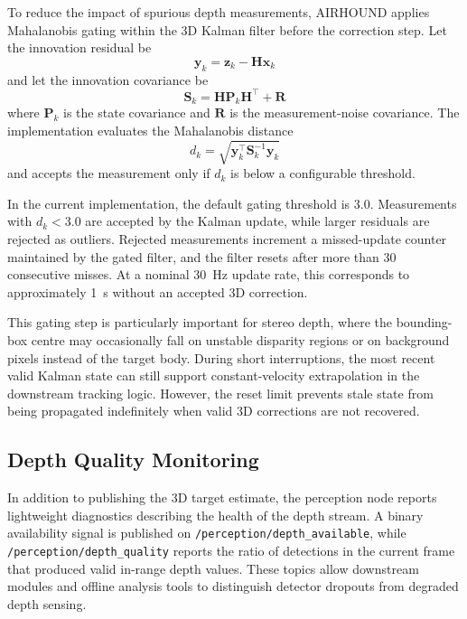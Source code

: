 \documentclass[11pt,letterpaper]{article}
\begin{document}
To reduce the impact of spurious depth measurements, AIRHOUND applies Mahalanobis gating within the 3D Kalman filter before the correction step. Let the innovation residual be
\begin{equation}
\mathbf{y}_k = \mathbf{z}_k - \mathbf{H}\mathbf{x}_k
\label{eq:innovation_residual}
\end{equation}
and let the innovation covariance be
\begin{equation}
\mathbf{S}_k = \mathbf{H}\mathbf{P}_k\mathbf{H}^\top + \mathbf{R}
\label{eq:innovation_covariance}
\end{equation}
where $\mathbf{P}_k$ is the state covariance and $\mathbf{R}$ is the measurement-noise covariance. The implementation evaluates the Mahalanobis distance
\begin{equation}
d_k = \sqrt{\mathbf{y}_k^\top \mathbf{S}_k^{-1}\mathbf{y}_k}
\label{eq:mahalanobis_distance}
\end{equation}
and accepts the measurement only if \(d_k\) is below a configurable threshold.

In the current implementation, the default gating threshold is 3.0. Measurements with \(d_k < 3.0\) are accepted by the Kalman update, while larger residuals are rejected as outliers. Rejected measurements increment a missed-update counter maintained by the gated filter, and the filter resets after more than 30 consecutive misses. At a nominal 30~Hz update rate, this corresponds to approximately 1~s without an accepted 3D correction.

This gating step is particularly important for stereo depth, where the bounding-box centre may occasionally fall on unstable disparity regions or on background pixels instead of the target body. During short interruptions, the most recent valid Kalman state can still support constant-velocity extrapolation in the downstream tracking logic. However, the reset limit prevents stale state from being propagated indefinitely when valid 3D corrections are not recovered.

\subsection{Depth Quality Monitoring}
\label{sec:depth_quality}

In addition to publishing the 3D target estimate, the perception node reports lightweight diagnostics describing the health of the depth stream. A binary availability signal is published on \texttt{/perception/depth\_available}, while \texttt{/perception/depth\_quality} reports the ratio of detections in the current frame that produced valid in-range depth values. These topics allow downstream modules and offline analysis tools to distinguish detector dropouts from degraded depth sensing.
\end{document}
